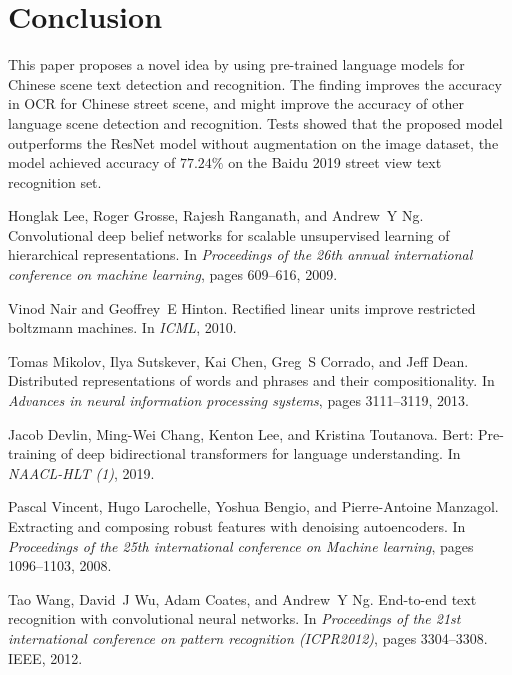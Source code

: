 \documentclass[review]{cvpr}
\begin{document}
\section{Conclusion}

This paper proposes a novel idea by using pre-trained language models for Chinese scene text detection and recognition.
The finding improves the accuracy in OCR for Chinese street scene, and might improve the accuracy of other language scene detection and recognition.
Tests showed that the proposed model outperforms the ResNet model without augmentation on the image dataset,
the model achieved accuracy of $77.24\%$ on the Baidu 2019 street view text recognition set.



{\small

%
\begin{thebibliography}{10}

Honglak Lee, Roger Grosse, Rajesh Ranganath, and Andrew~Y Ng.
\newblock Convolutional deep belief networks for scalable unsupervised learning
  of hierarchical representations.
\newblock In {\em Proceedings of the 26th annual international conference on
  machine learning}, pages 609--616, 2009.


Vinod Nair and Geoffrey~E Hinton.
\newblock Rectified linear units improve restricted boltzmann machines.
\newblock In {\em ICML}, 2010.


Tomas Mikolov, Ilya Sutskever, Kai Chen, Greg~S Corrado, and Jeff Dean.
\newblock Distributed representations of words and phrases and their
  compositionality.
\newblock In {\em Advances in neural information processing systems}, pages
  3111--3119, 2013.


Jacob Devlin, Ming-Wei Chang, Kenton Lee, and Kristina Toutanova.
\newblock Bert: Pre-training of deep bidirectional transformers for language
  understanding.
\newblock In {\em NAACL-HLT (1)}, 2019.


Pascal Vincent, Hugo Larochelle, Yoshua Bengio, and Pierre-Antoine Manzagol.
\newblock Extracting and composing robust features with denoising autoencoders.
\newblock In {\em Proceedings of the 25th international conference on Machine
  learning}, pages 1096--1103, 2008.


Tao Wang, David~J Wu, Adam Coates, and Andrew~Y Ng.
\newblock End-to-end text recognition with convolutional neural networks.
\newblock In {\em Proceedings of the 21st international conference on pattern
  recognition (ICPR2012)}, pages 3304--3308. IEEE, 2012.



\end{thebibliography}}
\end{document}
